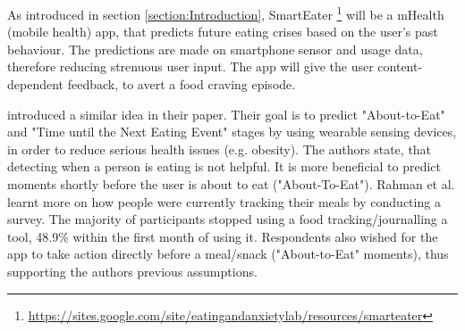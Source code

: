 
As introduced in section \ref{section:Introduction}, SmartEater \footnote{\url{https://sites.google.com/site/eatingandanxietylab/resources/smarteater}} will be a mHealth (mobile health) app, that predicts future eating crises based on the user's past behaviour. The predictions are made on smartphone sensor and usage data, therefore reducing strenuous user input. The app will give the user content-dependent feedback, to avert a food craving episode. 


\textcite{AboutToEat2016Rahman} introduced a similar idea in their paper. Their goal is to predict "About-to-Eat" and "Time until the Next Eating Event" stages by using wearable sensing devices, in order to reduce serious health issues (e.g. obesity). The authors state, that detecting when a person is eating is not helpful. It is more beneficial to predict moments shortly before the user is about to eat ("About-To-Eat").
Rahman et al. learnt more on how people were currently tracking their meals by conducting a survey. The majority of participants stopped using a food tracking/journalling a tool,  48.9\% within the first month of using it. Respondents also  wished for the app to take action directly before a meal/snack ("About-to-Eat" moments), thus supporting the authors previous assumptions.

